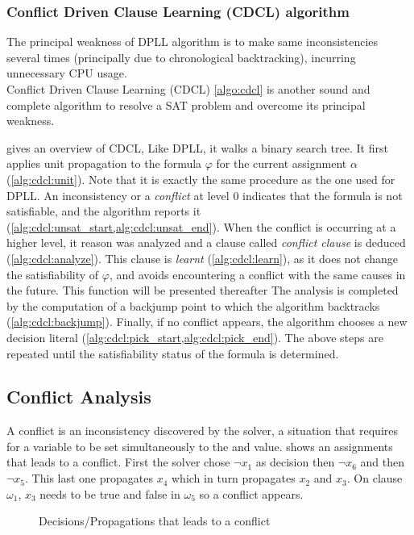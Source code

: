 %
%
\subsubsection{Conflict Driven Clause Learning (CDCL) algorithm}

The principal weakness of DPLL algorithm is to make same inconsistencies several times
(principally due to chronological backtracking), incurring unnecessary CPU usage.\\
Conflict Driven Clause Learning (CDCL) \cref{algo:cdcl} is another sound and complete algorithm
to resolve a SAT problem and overcome its principal weakness.


 gives an overview of CDCL, Like DPLL,  it walks a binary search tree.
It first applies unit propagation to the formula $\varphi$ for the current assignment $\alpha$ (\cref{alg:cdcl:unit}).
Note that it is exactly the same procedure as the one used for DPLL.
An inconsistency or a \emph{conflict} at level $0$ indicates that the formula is not satisfiable, and the algorithm
reports it (\cref{alg:cdcl:unsat_start,alg:cdcl:unsat_end}). When the conflict is occurring at a higher level, it
reason was analyzed and a clause called \emph{conflict clause} is deduced (\cref{alg:cdcl:analyze}).
 This clause is \emph{learnt} (\cref{alg:cdcl:learn}), as it does not change the
satisfiability of $\varphi$, and avoids encountering a conflict with the same
causes in the future. This function will be presented thereafter
The analysis is completed by the computation of a backjump point to which the algorithm backtracks (\cref{alg:cdcl:backjump}).
Finally, if no conflict appears, the algorithm chooses a new decision literal 
(\cref{alg:cdcl:pick_start,alg:cdcl:pick_end}).
The above steps are repeated until the satisfiability status of the
formula is determined.




\subsection{Conflict Analysis}
A conflict is an inconsistency discovered by the solver, a situation that requires for a variable to be set 
simultaneously to the \true and \false value.  shows an assignments that leads to a conflict.
First the solver chose $\neg x_1$ as decision then $\neg x_6$ and then $\neg x_5$. This last one propagates $x_4$
which in turn propagates $x_2$ and $x_3$. On clause $\omega_1$, $x_3$ needs to be true and false in $\omega_5$ so
a conflict appears.
\begin{figure}[H]
	\centering
		
	\caption{Decisions/Propagations that leads to a  conflict}
	\label{fig:conflict}
\end{figure}

